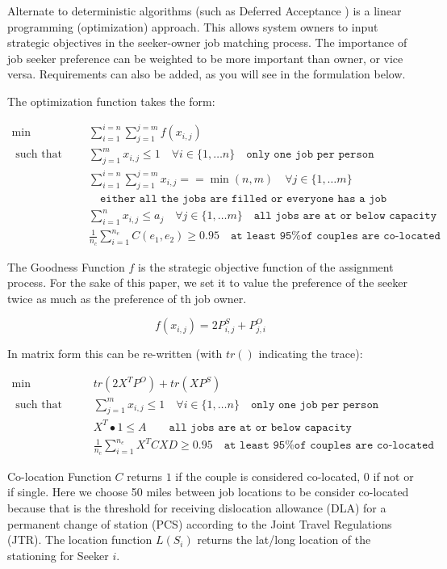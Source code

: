 Alternate to deterministic algorithms (such as Deferred Acceptance \cite{1962_Gale}) is a linear programming (optimization) approach. This allows system owners to input strategic objectives in the seeker-owner job matching process. The importance of job seeker preference can be weighted to be more important than owner, or vice versa. Requirements can also be added, as you will see in the formulation below.

The optimization function takes the form:

\begin{align}
\min \qquad & \sum_{i = 1}^{i=n} \sum_{j = 1}^{j=m} f(x_{i,j}) \\
\text{ such that } \qquad & \sum_{j=1}^m x_{i,j} \leq 1 \quad  \forall i \in \{1, \dots n\} \quad \texttt{only one job per person} \\
& \sum_{i = 1}^{i=n} \sum_{j = 1}^{j=m}x_{i,j} == \min(n,m) \quad  \forall j \in \{1, \dots m\} \\& \quad \texttt{either all the jobs are filled or everyone has a job} \\
& \sum_{i=1}^n x_{i,j} \leq a_j \quad  \forall j \in \{1, \dots m\} \quad \texttt{all jobs are at or below capacity} \\
& \frac{1}{n_c} \sum_{i=1}^{n_e} C(e_1, e_2) \geq 0.95 \quad \texttt{at least 95\% of couples are co-located}
\end{align}

The Goodness Function $f$ is the strategic objective function of the assignment process. For the sake of this paper, we set it to value the preference of the seeker twice as much as the preference of th job owner.

\[f(x_{i,j}) = 2P^S_{i,j} + P^O_{j,i}\]

In matrix form this can be re-written (with $tr()$ indicating the trace):

\begin{align}
\min \qquad & tr(2X^TP^O) + tr(XP^S) \\
\text{ such that } \qquad & \sum_{j=1}^m x_{i,j} \leq 1 \quad  \forall i \in \{1, \dots n\} \quad \texttt{only one job per person} \\
& X^T \bullet 1 \leq A \quad \quad \texttt{all jobs are at or below capacity} \\
& \frac{1}{n_c} \sum_{i=1}^{n_e} X^TCXD \geq 0.95 \quad \texttt{at least 95\% of couples are co-located}
\end{align}


Co-location Function $C$ returns $1$ if the couple is considered co-located, 0 if not or if single. Here we choose 50 miles between job locations to be consider co-located because that is the threshold for receiving dislocation allowance (DLA) for a permanent change of station (PCS) according to the Joint Travel Regulations (JTR). The location function $L(S_i)$ returns the lat/long location of the stationing for Seeker $i$. 

